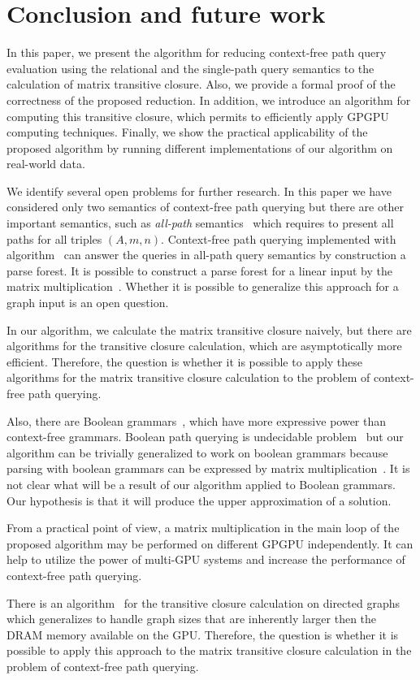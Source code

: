 \section{Conclusion and future work}
In this paper, we present the algorithm for reducing context-free path query evaluation using the relational and the single-path query semantics to the calculation of matrix transitive closure. Also, we provide a formal proof of the correctness of the proposed reduction. In addition, we introduce an algorithm for computing this transitive closure, which permits to efficiently apply GPGPU computing techniques. Finally, we show the practical applicability of the proposed algorithm by running different implementations of our algorithm on real-world data.

We identify several open problems for further research. In this paper we have considered only two semantics of context-free path querying but there are other important semantics, such as \textit{all-path} semantics~\cite{hellingsPathQuerying} which requires to present all paths for all triples $(A,m,n)$. Context-free path querying implemented with algorithm~\cite{GLL} can answer the queries in all-path query semantics by construction a parse forest. It is possible to construct a parse forest for a linear input by the matrix multiplication~\cite{okhotin_cyk}. Whether it is possible to generalize this approach for a graph input is an open question.

In our algorithm, we calculate the matrix transitive closure naively, but there are algorithms for the transitive closure calculation, which are asymptotically more efficient. Therefore, the question is whether it is possible to apply these algorithms for the matrix transitive closure calculation to the problem of context-free path querying.

Also, there are Boolean grammars~\cite{okhotinBoolean}, which have more expressive power than context-free grammars. Boolean path querying is undecidable problem~\cite{hellingsRelational} but our algorithm can be trivially generalized to work on boolean grammars because parsing with boolean grammars can be expressed by matrix multiplication~\cite{okhotin_cyk}. It is not clear what will be a result of our algorithm applied to Boolean grammars. Our hypothesis is that it will produce the upper approximation of a solution.

From a practical point of view, a matrix multiplication in the main loop of the proposed algorithm may be performed on different GPGPU independently. It can help to utilize the power of multi-GPU systems and increase the performance of context-free path querying.

There is an algorithm~\cite{apspGPU} for the transitive closure calculation on directed graphs which generalizes to handle graph sizes that are inherently larger then the DRAM memory available on the GPU. Therefore, the question is whether it is possible to apply this approach to the matrix transitive closure calculation in the problem of context-free path querying.